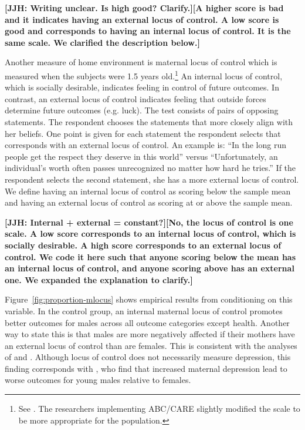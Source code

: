 \textbf{[JJH: Writing unclear. Is high good? Clarify.][A higher score is bad and it indicates having an external locus of control. A low score is good and corresponds to having an internal locus of control. It is the same scale. We clarified the description below.]}

Another measure of home environment is maternal locus of control which is measured when the subjects were 1.5 years old.\footnote{See \citet{Rotter_1966_PMGaA}. The researchers implementing ABC/CARE slightly modified the scale to be more appropriate for the population.} An internal locus of control, which is socially desirable, indicates feeling in control of future outcomes. In contrast, an external locus of control indicates feeling that outside forces determine future outcomes (e.g. luck). The test consists of pairs of opposing statements. The respondent chooses the statements that more closely align with her beliefs. One point is given for each statement the respondent selects that corresponds with an external locus of control. An example is: ``In the long run people get the respect they deserve in this world'' versus ``Unfortunately, an individual's worth often passes unrecognized no matter how hard he tries.'' If the respondent selects the second statement, she has a more external locus of control.  We define having an internal locus of control as scoring below the sample mean and having an external locus of control as scoring at or above the sample mean.

\textbf{[JJH: Internal + external = constant?][No, the locus of control is one scale. A low score corresponds to an internal locus of control, which is socially desirable. A high score corresponds to an external locus of control. We code it here such that anyone scoring below the mean has an internal locus of control, and anyone scoring above has an external one. We expanded the explanation to clarify.]} 

Figure~\ref{fig:proportion-mlocus} shows empirical results from conditioning on this variable. In the control group, an internal maternal locus of control promotes better outcomes for males across all outcome categories except health. Another way to state this is that males are more negatively affected if their mothers have an external locus of control than are females. This is consistent with the analyses of \citet{Schore_2017_IMHJ} and \citet{golding2016psychology}. Although locus of control does not necessarily measure depression, this finding corresponds with \citet{Beeghly-etal_2017_IMHJ}, who find that increased maternal depression lead to worse outcomes for young males relative to females.

